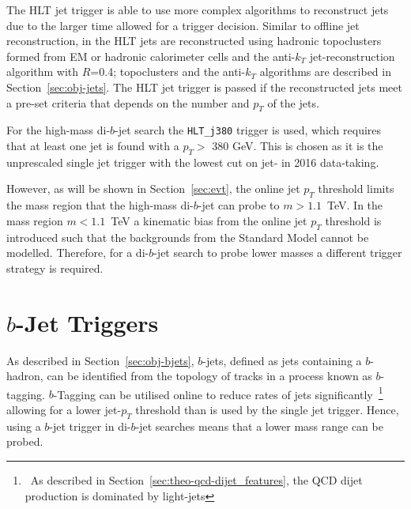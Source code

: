 
The HLT jet trigger is able to use more complex algorithms to reconstruct jets due to the larger time allowed for a trigger decision.
Similar to offline jet reconstruction, in the HLT jets are reconstructed using 
hadronic topoclusters formed from EM or hadronic calorimeter cells and the anti-$k_T$ jet-reconstruction algorithm with $R$=0.4;
topoclusters and the anti-$k_T$ algorithms are described in Section~\ref{sec:obj-jets}.
The HLT jet trigger is passed if the reconstructed jets meet a pre-set criteria that depends on the number and $p_T$ of the jets.


For the high-mass di-$b$-jet search the \verb|HLT_j380| trigger is used, which requires that at least one jet is found with a $p_T >$ 380 GeV.
This is chosen as it is the unprescaled single jet trigger with the lowest cut on jet-\pT{} in 2016 data-taking.

However, as will be shown in Section~\ref{sec:evt},
the online jet $p_T$ threshold limits the mass region that the high-mass di-$b$-jet can probe to $m > 1.1$~TeV.
In the mass region $m < 1.1$~TeV a kinematic bias from the online jet $p_T$ threshold is introduced
such that the backgrounds from the Standard Model cannot be modelled. 
Therefore, for a di-$b$-jet search to probe lower masses a different trigger strategy is required.

\vfill

\section{$b$-Jet Triggers}
\label{sec:trig-bjet}

As described in Section~\ref{sec:obj-bjets}, $b$-jets, defined as jets containing a $b$-hadron,
can be identified from the topology of tracks in a process known as $b$-tagging.
$b$-Tagging can be utilised online to reduce rates of jets significantly~\footnote{\ As described in Section~\ref{sec:theo-qcd-dijet_features},
  the QCD dijet production is dominated by light-jets}
allowing for a lower jet-$p_T$ threshold than is used by the single jet trigger.
Hence, using a $b$-jet trigger in di-$b$-jet searches means that a lower mass range can be probed.

